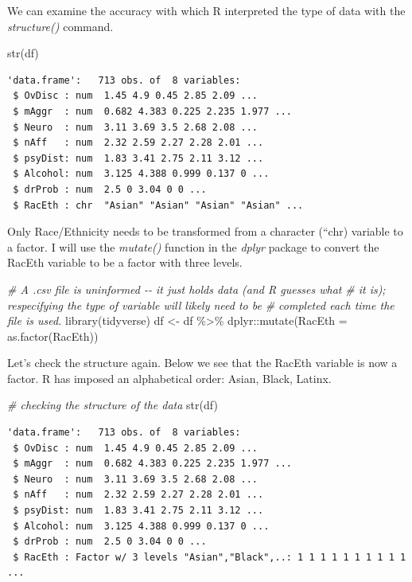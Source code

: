 \documentclass[
  11pt,
]{book}
\newenvironment{Shaded}{\begin{snugshade}}{\end{snugshade}}
\newcommand{\AttributeTok}[1]{\textcolor[rgb]{0.77,0.63,0.00}{#1}}
\newcommand{\CommentTok}[1]{\textcolor[rgb]{0.56,0.35,0.01}{\textit{#1}}}
\newcommand{\FunctionTok}[1]{\textcolor[rgb]{0.00,0.00,0.00}{#1}}
\newcommand{\NormalTok}[1]{#1}
\newcommand{\OtherTok}[1]{\textcolor[rgb]{0.56,0.35,0.01}{#1}}
\newcommand{\SpecialCharTok}[1]{\textcolor[rgb]{0.00,0.00,0.00}{#1}}
\begin{document}
We can examine the accuracy with which R interpreted the type of data with the \emph{structure()} command.

\begin{Shaded}
\begin{Highlighting}[]
\FunctionTok{str}\NormalTok{(df)}
\end{Highlighting}
\end{Shaded}

\begin{verbatim}
'data.frame':   713 obs. of  8 variables:
 $ OvDisc : num  1.45 4.9 0.45 2.85 2.09 ...
 $ mAggr  : num  0.682 4.383 0.225 2.235 1.977 ...
 $ Neuro  : num  3.11 3.69 3.5 2.68 2.08 ...
 $ nAff   : num  2.32 2.59 2.27 2.28 2.01 ...
 $ psyDist: num  1.83 3.41 2.75 2.11 3.12 ...
 $ Alcohol: num  3.125 4.388 0.999 0.137 0 ...
 $ drProb : num  2.5 0 3.04 0 0 ...
 $ RacEth : chr  "Asian" "Asian" "Asian" "Asian" ...
\end{verbatim}

Only Race/Ethnicity needs to be transformed from a character (``chr) variable to a factor. I will use the \emph{mutate()} function in the \emph{dplyr} package to convert the RacEth variable to be a factor with three levels.

\begin{Shaded}
\begin{Highlighting}[]
\CommentTok{\# A .csv file is uninformed {-}{-} it just holds data (and R guesses what}
\CommentTok{\# it is); respecifying the type of variable will likely need to be}
\CommentTok{\# completed each time the file is used.}
\FunctionTok{library}\NormalTok{(tidyverse)}
\NormalTok{df }\OtherTok{\textless{}{-}}\NormalTok{ df }\SpecialCharTok{\%\textgreater{}\%}
\NormalTok{    dplyr}\SpecialCharTok{::}\FunctionTok{mutate}\NormalTok{(}\AttributeTok{RacEth =} \FunctionTok{as.factor}\NormalTok{(RacEth))}
\end{Highlighting}
\end{Shaded}

Let's check the structure again. Below we see that the RacEth variable is now a factor. R has imposed an alphabetical order: Asian, Black, Latinx.

\begin{Shaded}
\begin{Highlighting}[]
\CommentTok{\# checking the structure of the data}
\FunctionTok{str}\NormalTok{(df)}
\end{Highlighting}
\end{Shaded}

\begin{verbatim}
'data.frame':   713 obs. of  8 variables:
 $ OvDisc : num  1.45 4.9 0.45 2.85 2.09 ...
 $ mAggr  : num  0.682 4.383 0.225 2.235 1.977 ...
 $ Neuro  : num  3.11 3.69 3.5 2.68 2.08 ...
 $ nAff   : num  2.32 2.59 2.27 2.28 2.01 ...
 $ psyDist: num  1.83 3.41 2.75 2.11 3.12 ...
 $ Alcohol: num  3.125 4.388 0.999 0.137 0 ...
 $ drProb : num  2.5 0 3.04 0 0 ...
 $ RacEth : Factor w/ 3 levels "Asian","Black",..: 1 1 1 1 1 1 1 1 1 1 ...
\end{verbatim}
\end{document}
